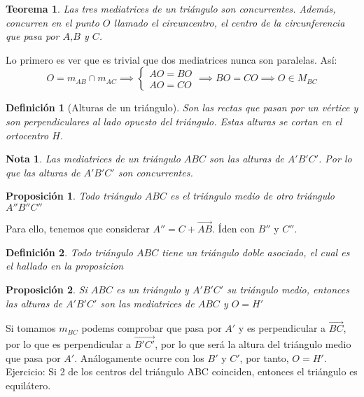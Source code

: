 \documentclass[11pt, a4paper, titlepage]{article}
\makeatletter
\renewenvironment{proof}[1][\proofname] {\vspace{-15pt}\par\pushQED{\qed}\normalfont\topsep6\p@\@plus6\p@\relax\trivlist\item[\hskip\labelsep\it#1\@addpunct{.}]\ignorespaces}{\popQED\endtrivlist\@endpefalse}
\renewcommand{\vec}{\overrightarrow}
\theoremstyle{theorem-style}
\newtheorem*{nth}{Teorema}
\newtheorem*{nprop}{Proposición}
\theoremstyle{definition-style}
\newtheorem*{ndef}{Definición}
\theoremstyle{remark-style}
\newtheorem*{nota}{Nota}
\theoremstyle{example-style}
\makeatother
\begin{document}
\begin{nth}
  Las tres mediatrices de un triángulo son concurrentes. Además, concurren en el punto $O$ llamado el circuncentro, el centro de la circunferencia que pasa por $A$,$B$ y $C$.
\end{nth}
\begin{proof}
  Lo primero es ver que es trivial que dos mediatrices nunca son paralelas. Así:
  \[
    O = m_{AB} \cap m_{AC}\implies \begin{cases}
      AO = BO\\
      AO = CO
    \end{cases} \implies BO = CO \implies O \in M_{BC}
  \]
\end{proof}


\begin{ndef}[Alturas de un triángulo]
  Son las rectas que pasan por un vértice y son perpendiculares al lado opuesto del triángulo. Estas alturas se cortan en el ortocentro $H$.
\end{ndef}

\begin{nota}
  Las mediatrices de un triángulo $ABC$ son las alturas de $A'B'C'$. Por lo que las alturas de $A'B'C'$ son concurrentes.
\end{nota}

\begin{nprop}
  Todo triángulo $ABC$ es el triángulo medio de otro triángulo $A''B''C''$
\end{nprop}
\begin{proof}
  Para ello, tenemos que considerar $A'' = C+ \vec{AB}$. Íden con $B''$ y $C''$.
\end{proof}
\begin{ndef}
  Todo triángulo $ABC$ tiene un triángulo doble asociado, el cual es el hallado en la proposicion 
\end{ndef}


\begin{nprop}
  Si $ABC$ es un triángulo y $A'B'C'$ su triángulo medio, entonces las alturas de $A'B'C'$ son las mediatrices de $ABC$ y $O=H'$
\end{nprop}
\begin{proof}
  Si tomamos $m_{BC}$ podems comprobar que pasa por $A'$ y es perpendicular a $\vec{BC}$, por lo que es perpendicular a $\vec{B'C'}$, por lo que será la altura del triángulo medio que pasa por $A'$. Análogamente ocurre con los $B'$ y $C'$, por tanto, $O=H'$.
\end{proof}
Ejercicio: Si 2 de los centros del triángulo ABC coinciden, entonces el triángulo es equilátero.
\end{document}
